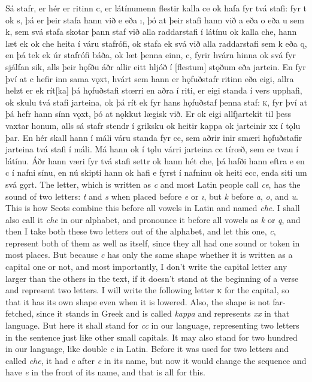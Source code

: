 \begin{paracol}{2}
  Sá stafr, er hér er ritinn c, er látínumenn flestir kalla ce ok hafa fyr tvá stafi: fyr t ok s, þá er þeir stafa hann við e eða ı, þó at þeir stafi hann við a eða o eða u sem k, sem svá stafa skotar þann staf við alla raddarstafi í látínu ok kalla che, hann læt ek ok che heita í váru stafrófi, ok stafa ek svá við alla raddarstafi sem k eða q, en þá tek ek úr stafrófi báða, ok læt þenna einn, c, fyrir hvárn hinna ok svá fyr sjálfan sik, alls þeir hǫfðu áðr allir eitt hljóð í [flestum] stǫðum eða jartein. En fyr því at c hefir inn sama vǫxt, hvárt sem hann er hǫfuðstafr ritinn eða eigi, allra helzt er ek rít[ka] þá hǫfuðstafi stœrri en aðra í riti, er eigi standa í vers upphafi, ok skulu tvá stafi jarteina, ok þá rít ek fyr hans hǫfuðstaf þenna staf: \textsc{k}, fyr því at þá hefr hann sínn vǫxt, þó at nǫkkut lægisk við. Er ok eigi allfjartekit til þess vaxtar honum, alls sá stafr stendr í griksku ok heitir kappa ok jarteinir xx í tǫlu þar. En hér skall hann í máli váru standa fyr cc, sem aðrir inir smæri hǫfuðstafir jarteina tvá stafi í máli. Má hann ok í tǫlu várri jarteina cc tírœð, sem ce tvau í látínu. Áðr hann væri fyr tvá stafi settr ok hann hét che, þá hafði hann eftra e en c í nafni sínu, en nú skipti hann ok hafi e fyrst í nafninu ok heiti ecc, enda siti um svá gǫrt.
  \switchcolumn
  The letter, which is written as \textit{c} and most Latin people call \textit{ce}, has the sound of two letters: \textit{t} and \textit{s} when placed before \textit{e} or \textit{ı}, but \textit{k} before \textit{a}, \textit{o}, and \textit{u}. This is how Scots combine this before all vowels in Latin and named \textit{che}. I shall also call it \textit{che} in our alphabet, and pronounce it before all vowels as \textit{k} or \textit{q}, and then I take both these two letters out of the alphabet, and let this one, \textit{c}, represent both of them as well as itself, since they all had one sound or token in most places. But because \textit{c} has only the same shape whether it is written as a capital one or not, and most importantly, I don't write the capital letter any larger than the others in the text, if it doesn't stand at the beginning of a verse and represent two letters. I will write the following letter \textsc{\textsc{k}} for the capital, so that it has its own shape even when it is lowered. Also, the shape is not far-fetched, since it stands in Greek and is called \textit{kappa} and represents \textit{xx} in that language. But here it shall stand for \textit{cc} in our language, representing two letters in the sentence just like other small capitals. It may also stand for two hundred in our language, like double \textit{c} in Latin. Before it was used for two letters and called \textit{che}, it had \textit{e} after \textit{c} in its name, but now it would change the sequence and have \textit{e} in the front of its name, and that is all for this.
\end{paracol}
